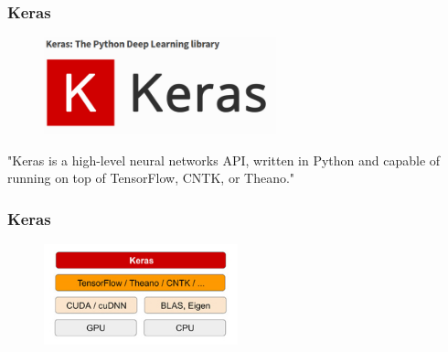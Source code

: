 \begin{frame}
        \frametitle{Keras}

         \begin{figure}
                \includegraphics[width=0.6\textwidth]{Pics/keras.png}
        \end{figure}

	"Keras is a high-level neural networks API, written in Python and capable of running on 
	top of TensorFlow, CNTK, or Theano."

\end{frame}

\begin{frame}
        \frametitle{Keras}

         \begin{figure}
                \includegraphics[width=0.5\textwidth]{Pics/keras2.jpg}
        \end{figure}

\end{frame}


